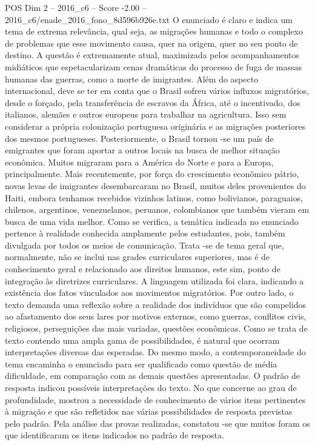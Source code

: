 \begin{textsample}{POS Dim 2 – 2016\_c6 – Score -2.00 – 2016\_c6/enade\_2016\_fono\_8d596b926e.txt}
O enunciado é claro e indica um tema de extrema relevância, qual seja, as migrações humanas e todo o complexo de problemas que esse movimento causa, quer na origem, quer no seu ponto de destino.
A questão é extremamente atual, maximizada pelos acompanhamentos midiáticos que espetacularizam cenas dramáticas do processo de fuga de massas humanas das guerras, como a morte de imigrantes.
Além do aspecto internacional, deve se ter em conta que o Brasil sofreu vários influxos migratórios, desde o forçado, pela transferência de escravos da África, até o incentivado, dos italianos, alemães e outros europeus para trabalhar na agricultura.
Isso sem considerar a própria colonização portuguesa originária e as migrações posteriores dos mesmos portugueses.
Posteriormente, o Brasil tornou -se um país de emigrantes que foram aportar a outros locais na busca de melhor situação econômica.
Muitos migraram para a América do Norte e para a Europa, principalmente.
Mais recentemente, por força do crescimento econômico pátrio, novas levas de imigrantes desembarcaram no Brasil, muitos deles provenientes do Haiti, embora tenhamos recebidos vizinhos latinos, como bolivianos, paraguaios, chilenos, argentinos, venezuelanos, peruanos, colombianos que também vieram em busca de uma vida melhor.
Como se verifica, a temática indicada no enunciado pertence à realidade conhecida amplamente pelos estudantes, pois, também divulgada por todos os meios de comunicação.
Trata -se de tema geral que, normalmente, não se inclui nas grades curriculares superiores, mas é de conhecimento geral e relacionado aos direitos humanos, este sim, ponto de integração às diretrizes curriculares.
A linguagem utilizada foi clara, indicando a existência dos fatos vinculados aos movimentos migratórios.
Por outro lado, o texto demanda uma reflexão sobre a realidade dos indivíduos que são compelidos ao afastamento dos seus lares por motivos externos, como guerras, conflitos civis, religiosos, perseguições das mais variadas, questões econômicas.
Como se trata de texto contendo uma ampla gama de possibilidades, é natural que ocorram interpretações diversas das esperadas.
Do mesmo modo, a contemporaneidade do tema encaminha o enunciado para ser qualificado como questão de média dificuldade, em comparação com as demais questões apresentadas.
O padrão de resposta indicou possíveis interpretações do texto.
No que concerne ao grau de profundidade, mostrou a necessidade de conhecimento de vários itens pertinentes à migração e que são refletidos nas várias possibilidades de resposta previstas pelo padrão.
Pela análise das provas realizadas, constatou -se que muitos foram os que identificaram os itens indicados no padrão de resposta.

\end{textsample}
